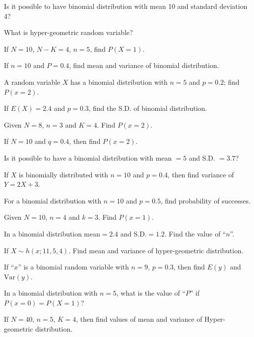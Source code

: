 \documentclass[11pt,a4paper]{article}
\begin{document}
\begin{shortlist}
\item Is it possible to have binomial distribution with mean 10 and standard deviation 4?

\item What is hyper-geometric random variable?

\item If $N=10$, $N-K=4$, $n=5$, find $P(X=1)$.

\item If $n=10$ and $P=0.4$, find mean and variance of binomial distribution.

\item A random variable $X$ has a binomial distribution with $n=5$ and $p=0.2$; find $P(x=2)$.

\item If $E(X)=2.4$ and $p=0.3$, find the S.D. of binomial distribution.

\item Given $N=8$, $n=3$ and $K=4$. Find $P(x=2)$.

\item If $N=10$ and $q=0.4$, then find $P(x=2)$.

\item Is it possible to have a binomial distribution with mean $=5$ and S.D. $=3.7$?

\item If $X$ is binomially distributed with $n=10$ and $p=0.4$, then find variance of $Y=2X+3$.

\item For a binomial distribution with $n=10$ and $p=0.5$, find probability of successes.

\item Given $N=10$, $n=4$ and $k=3$. Find $P(x=1)$.

\item In a binomial distribution mean$=2.4$ and S.D.$=1.2$. Find the value of ``$n$''.

\item If $X\sim h(x;11,5,4)$. Find mean and variance of hyper-geometric distribution.

\item If ``$x$'' is a binomial random variable with $n=9$, $p=0.3$, then find $E(y)$ and $\mathrm{Var}(y)$.

\item In a binomial distribution with $n=5$, what is the value of ``$P$'' if $P(x=0)=P(X=1)$?

\item If $N=40$, $n=5$, $K=4$, then find values of mean and variance of Hyper-geometric distribution.


\end{shortlist}
\end{document}
